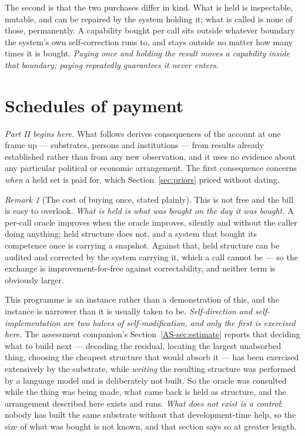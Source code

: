 \documentclass[11pt,a4paper]{article}
\theoremstyle{remark}
\newtheorem{remark}[definition]{Remark}
\begin{document}
The second is that the two purchases differ in kind. What is held is inspectable, mutable, and can be
repaired by the system holding it; what is called is none of those, permanently. A capability bought
per call sits outside whatever boundary the system's own self-correction runs to, and stays outside no
matter how many times it is bought. \emph{Paying once and holding the result moves a capability inside
that boundary; paying repeatedly guarantees it never enters.}

\section{Schedules of payment}\label{sec:schedules}
\emph{Part II begins here.} What follows derives consequences of the account at one frame up ---
substrates, persons and institutions --- from results already established rather than from any new
observation, and it uses no evidence about any particular political or economic arrangement. The
first consequence concerns \emph{when} a held set is paid for, which Section~\ref{sec:priors} priced
without dating.

\begin{remark}[The cost of buying once, stated plainly]\label{rem:oracle-cost}
This is not free and the bill is easy to overlook. \emph{What is held is what was bought on the day it
was bought.} A per-call oracle improves when the oracle improves, silently and without the caller doing
anything; held structure does not, and a system that bought its competence once is carrying a snapshot.
Against that, held structure can be audited and corrected by the system carrying it, which a call
cannot be --- so the exchange is improvement-for-free against correctability, and neither term is
obviously larger.

This programme is an instance rather than a demonstration of this, and the instance is narrower than
it is usually taken to be. \emph{Self-direction and self-implementation are two halves of
self-modification, and only the first is exercised here.} The assessment companion's
Section~\ref{AS-sec:estimate} reports that deciding what to build next --- decoding the residual,
locating the largest unabsorbed thing, choosing the cheapest structure that would absorb it --- has
been exercised extensively by the substrate, while \emph{writing} the resulting structure was
performed by a language model and is deliberately not built. So the oracle was consulted while the
thing was being made, what came back is held as structure, and the arrangement described here exists
and runs. \emph{What does not exist is a control}: nobody has built the same substrate without that
development-time help, so the size of what was bought is not known, and that section says so at
greater length.
\end{remark}
\end{document}

